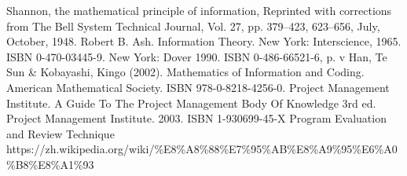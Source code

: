 \documentclass[12pt,a4paper,]{article}
\begin{document}
\begin{thebibliography}{}
\bibitem  Shannon, the mathematical principle of information, Reprinted with corrections from The Bell System Technical Journal, Vol. 27, pp. 379–423, 623–656, July, October, 1948.
\bibitem Robert B. Ash. Information Theory. New York: Interscience, 1965. ISBN 0-470-03445-9. New York: Dover 1990. ISBN 0-486-66521-6, p. v
\bibitem  Han, Te Sun \& Kobayashi, Kingo (2002). Mathematics of Information and Coding. American Mathematical Society. ISBN 978-0-8218-4256-0.
\bibitem  Project Management Institute. A Guide To The Project Management Body Of Knowledge 3rd ed. Project Management Institute. 2003. ISBN 1-930699-45-X
\bibitem Program Evaluation and Review Technique https://zh.wikipedia.org/wiki/\%E8\%A8\%88\%E7\%95\%AB\%E8\%A9\%95\%E6\%A0\%B8\%E8\%A1\%93

\end{thebibliography}



\end{document}
